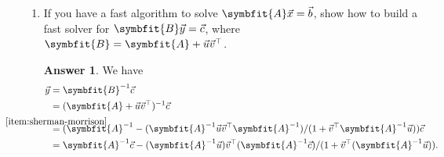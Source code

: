 \documentclass{article}
\theoremstyle{definition}
\newtheorem*{answer}{Answer}
\newcommand{\mat}[1]{\symbfit{#1}}
\begin{document}
\begin{enumerate}[leftmargin=\labelsep]
\begin{enumerate}
\begin{proof}
\begin{align*}
				                                                                                         & = \mat{I} - \mat{V}^\top (\mat{A} + \mat{U}\mat{V}^\top)^{-1}\mat{U} + \mat{V}^\top \mat{A}^{-1} \mat{U} - \mat{V}^\top \mat{A}^{-1} \mat{U}\mat{V}^\top (\mat{A} + \mat{U}\mat{V}^\top)^{-1}\mat{U} \\
				                                                                                         & = \mat{I} - \mat{V}^\top \mat{A}^{-1}\qty[\mat{A}(\mat{A} + \mat{U}\mat{V}^\top)^{-1} - \mat{I} + \mat{U}\mat{V}^\top (\mat{A} + \mat{U}\mat{V}^\top)^{-1}]\mat{U}                                   \\
				                                                                                         & = \mat{I} - \mat{V}^\top \mat{A}^{-1}\qty[(\mat{A} + \mat{U}\mat{V}^\top)(\mat{A} + \mat{U}\mat{V}^\top)^{-1} - \mat{I}]\mat{U}                                                                      \\
				                                                                                         & = \mat{I},
			            \end{align*}
			            therefore \(\mat{T}\) is invertible and non-singular.
		            \end{proof}

		      \item If you have a fast algorithm to solve \(\mat{A}\vec{x} = \vec{b}\), show how to build a fast solver for \(\mat{B}\vec{y} = \vec{c}\), where \(\mat{B} = \mat{A} + \vec{u}\vec{v}^\top\).
		            \begin{answer}
			            We have
			            \begin{align*}
				            \vec{y} & = \mat{B}^{-1} \vec{c}                                                                                                                                              \\
				                    & = (\mat{A} + \vec{u}\vec{v}^\top)^{-1} \vec{c}                                                                                                                      \\
				                    & \stackrel{\mathclap{\ref{item:sherman-morrison}}}{=} (\mat{A}^{-1} - (\mat{A}^{-1}\vec{u}\vec{v}^\top\mat{A}^{-1})/(1 + \vec{v}^\top \mat{A}^{-1} \vec{u})) \vec{c} \\
				                    & = \mat{A}^{-1}\vec{c} - (\mat{A}^{-1}\vec{u})\vec{v}^\top(\mat{A}^{-1}\vec{c})/(1 + \vec{v}^\top (\mat{A}^{-1} \vec{u})).
			            \end{align*}


\end{answer}
\end{enumerate}
\end{enumerate}
\end{document}
